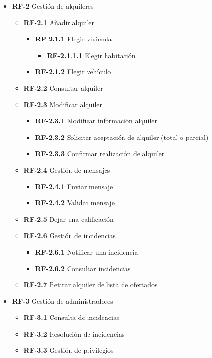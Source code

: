 \documentclass[11pt,spanish]{article} %
\begin{document}
\begin{itemize}
	\item \textbf{RF-2} Gestión de alquileres
	\begin{itemize}
		\item \textbf{RF-2.1} Añadir alquiler
		\begin{itemize}
			\item \textbf{RF-2.1.1} Elegir vivienda
			\begin{itemize}
				\item \textbf{RF-2.1.1.1} Elegir habitación
			\end{itemize}
			\item \textbf{RF-2.1.2} Elegir vehículo
		\end{itemize}
		\item \textbf{RF-2.2} Consultar alquiler
		\item \textbf{RF-2.3} Modificar alquiler
		\begin{itemize}
			\item \textbf{RF-2.3.1} Modificar información alquiler
			\item \textbf{RF-2.3.2} Solicitar aceptación de alquiler (total o parcial)
			\item \textbf{RF-2.3.3} Confirmar realización de alquiler
		\end{itemize}
		\item \textbf{RF-2.4} Gestión de mensajes
		\begin{itemize}
			\item \textbf{RF-2.4.1} Enviar mensaje
			\item \textbf{RF-2.4.2} Validar mensaje
		\end{itemize}
		\item \textbf{RF-2.5} Dejar una calificación
		\item \textbf{RF-2.6} Gestión de incidencias
		\begin{itemize}
			\item \textbf{RF-2.6.1} Notificar una incidencia 
			\item \textbf{RF-2.6.2} Consultar incidencias
		\end{itemize}
		\item \textbf{RF-2.7} Retirar alquiler de lista de ofertados
	\end{itemize}	

	\item \textbf{RF-3} Gestión de administradores
	\begin{itemize}
		\item \textbf{RF-3.1} Consulta de incidencias
		\item \textbf{RF-3.2} Resolución de incidencias
		\item \textbf{RF-3.3} Gestión de privilegios
	\end{itemize}
\end{itemize}
\end{document}
